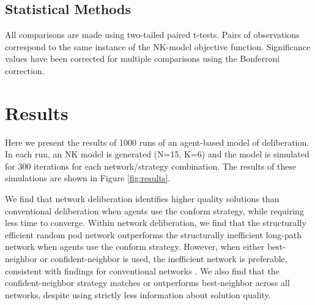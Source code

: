 \subsection{Statistical Methods}
All comparisons are made using two-tailed paired t-tests. Pairs of observations correspond to the same instance of the NK-model objective function.
Significance values have been corrected for multiple comparisons using the Bonferroni correction.

\section{Results}

Here we present the results of 1000 runs of an agent-based model of deliberation.
In each run, an NK model is generated (N=15, K=6) and the model is simulated for 300
iterations for each network/strategy combination.
The results of these simulations are shown in Figure \ref{fig:results}.

We find that network deliberation identifies higher quality solutions than
conventional deliberation when agents use the conform strategy,
while requiring less time to converge. Within network deliberation,
we find that the structurally efficient random pod network outperforms the
structurally inefficient long-path network when agents use the conform strategy.
However, when either best-neighbor or confident-neighbor is used,
the inefficient network is preferable, consistent with findings for conventional
networks \cite{barkoczi_social_2016}. We also find that the confident-neighbor
strategy matches or outperforms best-neighbor across all networks,
despite using strictly less information about solution quality.

